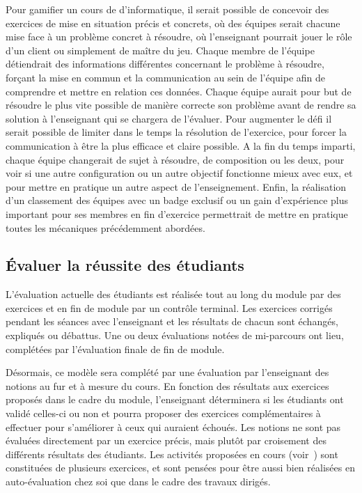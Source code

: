 Pour gamifier un cours de d'informatique, il serait possible de concevoir des exercices de mise en situation précis et concrets, où des équipes serait chacune mise face à un problème concret à résoudre, où l'enseignant pourrait jouer le rôle d'un client ou simplement de maître du jeu. Chaque membre de l'équipe détiendrait des informations différentes concernant le problème à résoudre, forçant la mise en commun et la communication au sein de l'équipe afin de comprendre et mettre en relation ces données. Chaque équipe aurait pour but de résoudre le plus vite possible de manière correcte son problème avant de rendre sa solution à l'enseignant qui se chargera de l'évaluer. Pour augmenter le défi il serait possible de limiter dans le temps la résolution de l'exercice, pour forcer la communication à être la plus efficace et claire possible. A la fin du temps imparti, chaque équipe changerait de sujet à résoudre, de composition ou les deux, pour voir si une autre configuration ou un autre objectif fonctionne mieux avec eux, et pour mettre en pratique un autre aspect de l'enseignement. Enfin, la réalisation d'un classement des équipes avec un badge exclusif ou un gain d'expérience plus important pour ses membres en fin d'exercice permettrait de mettre en pratique toutes les mécaniques précédemment abordées.

\subsection{Évaluer la réussite des étudiants}
L'évaluation actuelle des étudiants est réalisée tout au long du module par des exercices et en fin de module par un contrôle terminal. Les exercices corrigés pendant les séances avec l'enseignant et les résultats de chacun sont échangés, expliqués ou débattus. Une ou deux évaluations notées de mi-parcours ont lieu, complétées par l'évaluation finale de fin de module. \par 

Désormais, ce modèle sera complété par une évaluation par l'enseignant des notions au fur et à mesure du cours. En fonction des résultats aux exercices proposés dans le cadre du module, l'enseignant déterminera si les étudiants ont validé celles-ci ou non et pourra proposer des exercices complémentaires à effectuer pour s'améliorer à ceux qui auraient échoués. Les notions ne sont pas évaluées directement par un exercice précis, mais plutôt par croisement des différents résultats des étudiants. Les activités proposées en cours (voir~) sont constituées de plusieurs exercices, et sont pensées pour être aussi bien réalisées en auto-évaluation chez soi que dans le cadre des travaux dirigés. \par

